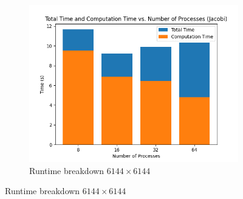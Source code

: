 \documentclass{article}
\begin{document}
\begin{figure}[ht]
    \begin{subfigure}{0.6\textwidth}
        \includegraphics[width=\textwidth]{a5/plots/bar-chart-Jacobi-large.png}
        \caption{Runtime breakdown $6144 \times 6144$}
        \label{fig:jacobi6144time}
    \end{subfigure}
\end{figure}
\FloatBarrier

\clearpage
\end{document}
